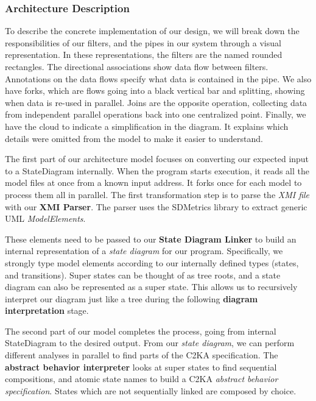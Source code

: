 \documentclass[11pt]{article}
\begin{document}
    \newpage
    \subsubsection{Architecture Description}\label{subsubsec:arch-desc}
    To describe the concrete implementation of our design,
    we will break down the responsibilities of our filters, and the pipes in our system through a visual representation.
    In these representations, the filters are the named rounded rectangles.
    The directional associations show data flow between filters.
    Annotations on the data flows specify what data is contained in the pipe.
    We also have forks, which are flows going into a black vertical bar and splitting, showing when data is re-used in parallel.
    Joins are the opposite operation, collecting data from independent parallel operations back into one centralized point.
    Finally, we have the cloud to indicate a simplification in the diagram.
    It explains which details were omitted from the model to make it easier to understand.

    The first part of our architecture model focuses on converting our expected input to a StateDiagram internally.
    When the program starts execution, it reads all the model files at once from a known input address.
    It forks once for each model to process them all in parallel.
    The first transformation step is to parse the \textit{XMI file} with our \textbf{XMI Parser}.
    The parser uses the SDMetrics library to extract generic UML \textit{ModelElements}.

    These elements need to be passed to our \textbf{State Diagram Linker}
    to build an internal representation of a \textit{state diagram} for our program.
    Specifically, we strongly type model elements according to our internally defined types (states, and transitions).
    Super states can be thought of as tree roots, and a state diagram can also be represented as a super state.
    This allows us to recursively interpret our diagram just like a tree during the following \textbf{diagram interpretation} stage.

    The second part of our model completes the process, going from internal StateDiagram to the desired output.
    From our \textit{state diagram}, we can perform different analyses in parallel to find parts of the C2KA specification.
    The \textbf{abstract behavior interpreter} looks at super states to find sequential compositions,
    and atomic state names to build a C2KA \textit{abstract behavior specification}.
    States which are not sequentially linked are composed by choice.
\end{document}
